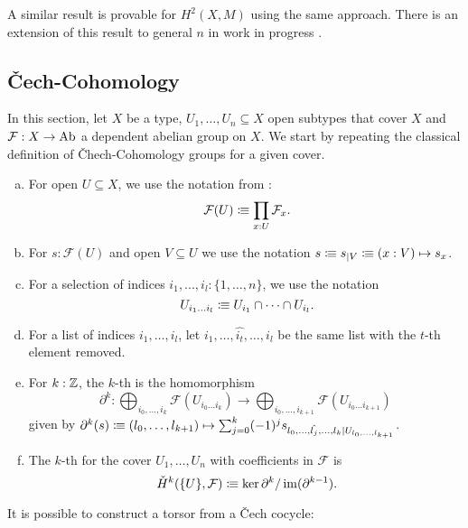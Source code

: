 A similar result is provable for $H^2(X,M)$ using the same approach.
There is an extension of this result to general $n$ in work in progress \cite{cech-draft}.

\subsection{Čech-Cohomology}

In this section, let $X$ be a type, $U_1,\dots,U_n\subseteq X$ open subtypes that cover $X$
and $\mathcal F:X\to \operatorname{Ab}$ a dependent abelian group on $X$.
We start by repeating the classical definition of \v{C}hech-Cohomology groups for a given cover.

\begin{definition}%
  \label{chech-complex}
  \begin{enumerate}[(a)]
  \item {} For open $U\subseteq X$, we use the notation from :
    \[
      \mathcal F(U)\colonequiv \prod_{x:U}\mathcal F_x\rlap{.}
    \]
  \item For $s:\mathcal F(U)$ and open $V\subseteq U$ we use the notation $s\vcentcolon\mspace{-1.2mu}\equiv s_{|V} \vcentcolon\mspace{-1.2mu}\equiv (x:V)\mapsto s_x$.
  \item {}For a selection of indices $i_1,...,i_l:\{1,\dots,n\}$, we use the notation
    \[
      U_{i_1\dots i_l}\colonequiv U_{i_1}\cap\dots\cap U_{i_l}\rlap{.}
    \]
  \item For a list of indices $i_1,\dots,i_l$, let $i_1,\dots,\hat{i_t},\dots,i_l$ be the same list with the $t$-th element removed.
  \item For $k:\mathbb{Z}$, the $k$-th  is the homomorphism
    \[
      \partial^k:\bigoplus_{i_0,\dots,i_k}\mathcal F(U_{i_0\dots i_k})\to \bigoplus_{i_0,\dots,i_{k+1}}\mathcal F(U_{i_0\dots i_{k+1}})
    \]
    given by $\partial^k(s)\vcentcolon\mspace{-1.2mu}\equiv (l_0,\dots,l_{k+1}) \mapsto \sum_{j=0}^k (-1)^j s_{l_0,\dots,\hat{l_j},\dots,l_k|U_{l_0,\dots,l_{k+1}}}$.
  \item The $k$-th  for the cover $U_1,\dots,U_n$ with coefficients in $\mathcal F$ is
    \[
      \check{H}^k(\{U\},\mathcal F)\colonequiv \ker\partial^{k} / \im(\partial^{k-1})\rlap{.}
    \]
  \end{enumerate}
\end{definition}

It is possible to construct a torsor from a \v{C}ech cocycle:

